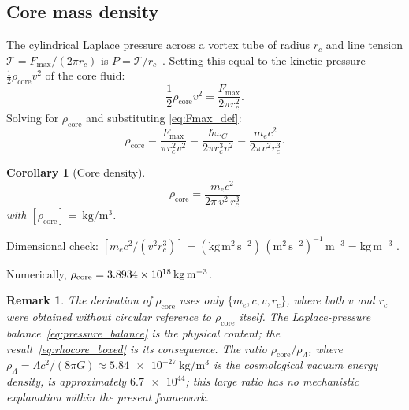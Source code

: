 \documentclass[aps,pra,preprint,longbibliography,nofootinbib]{revtex4-2}
\newtheorem{corollary}{Corollary}
\newtheorem{remark}{Remark}
\newcommand{\vc}{v}              %
\newcommand{\rc}{r_c}            %
\newcommand{\omC}{\omega_C}      %
\newcommand{\Fmax}{F_{\max}}     %
\newcommand{\rhocore}{\rho_{\mathrm{core}}} %
\begin{document}
\subsection{Core mass density}
\label{sec:rhocore}

The cylindrical Laplace pressure across a vortex tube of radius $\rc$
and line tension $\mathcal{T} = \Fmax/(2\pi\rc)$ is
$P = \mathcal{T}/\rc$~\cite{Saffman1992,Donnelly1991}.
Setting this equal to the kinetic pressure $\frac{1}{2}\rhocore\vc^2$
of the core fluid:
\begin{equation}
  \frac{1}{2}\rhocore\vc^2 = \frac{\Fmax}{2\pi\rc^2}.
  \label{eq:pressure_balance}
\end{equation}
Solving for $\rhocore$ and substituting \eqref{eq:Fmax_def}:
\begin{equation}
  \rhocore = \frac{\Fmax}{\pi\rc^2\vc^2}
           = \frac{\hbar\omC}{2\pi\rc^3\vc^2}
           = \frac{m_e c^2}{2\pi\vc^2\rc^3}.
  \label{eq:rhocore}
\end{equation}

\begin{corollary}[Core density]
\label{cor:rho}
\begin{equation}
  \boxed{
    \rhocore = \frac{m_e c^2}{2\pi\,\vc^2\,\rc^3}
  }
  \label{eq:rhocore_boxed}
\end{equation}
with $[\rhocore] = \SI{}{\kilogram\per\cubic\meter}$.
\end{corollary}

Dimensional check:
$[m_e c^2 / (\vc^2 \rc^3)]
= \mathrm{(kg\,m^2\,s^{-2})\,(m^2\,s^{-2})^{-1}\,m^{-3}}
= \mathrm{kg\,m^{-3}}$ \checkmark.

Numerically, $\rhocore = \SI{3.893\,4e18}{\kilogram\per\cubic\meter}$.

\begin{remark}
The derivation of $\rhocore$ uses only $\{m_e, c, \vc, \rc\}$,
where both $\vc$ and $\rc$ were obtained without circular reference
to $\rhocore$ itself.
The Laplace-pressure balance~\eqref{eq:pressure_balance} is the
physical content; the result~\eqref{eq:rhocore_boxed} is its
consequence.
The ratio $\rhocore/\rho_{\Lambda}$, where
$\rho_{\Lambda} = \Lambda c^2/(8\pi G) \approx \SI{5.84e-27}{\kilogram\per\cubic\meter}$
is the cosmological vacuum energy density, is approximately
$\num{6.7e44}$;
this large ratio has no mechanistic explanation within the present
framework.
\end{remark}
\end{document}
